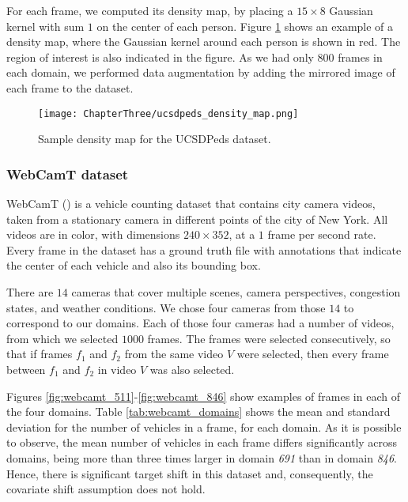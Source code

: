 For each frame, we computed its density map, by placing a $15 \times 8$ Gaussian kernel with sum $1$ on the center of each person. Figure \ref{fig:ucsdpeds_density_map} shows an example of a density map, where the Gaussian kernel around each person is shown in red. The region of interest is also indicated in the figure. As we had only $800$ frames in each domain, we performed data augmentation by adding the mirrored image of each frame to the dataset.

\begin{figure}[!ht]
	\centering
	\texttt{[image: ChapterThree/ucsdpeds\_density\_map.png]}
	\caption{Sample density map for the UCSDPeds dataset.}
	\label{fig:ucsdpeds_density_map}
\end{figure}

\subsubsection{WebCamT dataset}
\label{sec:da_sensors_webcamt}

WebCamT (\citet{Zhang2017b}) is a vehicle counting dataset that contains city camera videos, taken from a stationary camera in different points of the city of New York. All videos are in color, with dimensions $240 \times 352$, at a $1$ frame per second rate. Every frame in the dataset has a ground truth file with annotations that indicate the center of each vehicle and also its bounding box.

There are $14$ cameras that cover multiple scenes, camera perspectives, congestion states, and weather conditions. We chose four cameras from those $14$ to correspond to our domains. Each of those four cameras had a number of videos, from which we selected $1000$ frames. The frames were selected consecutively, so that if frames $f_1$ and $f_2$ from the same video $V$ were selected, then every frame between $f_1$ and $f_2$ in video $V$ was also selected.

Figures \ref{fig:webcamt_511}-\ref{fig:webcamt_846} show examples of frames in each of the four domains. Table \ref{tab:webcamt_domains} shows the mean and standard deviation for the number of vehicles in a frame, for each domain. As it is possible to observe, the mean number of vehicles in each frame differs significantly across domains, being more than three times larger in domain \textit{691} than in domain \textit{846}. Hence, there is significant target shift in this dataset and, consequently, the covariate shift assumption does not hold.

